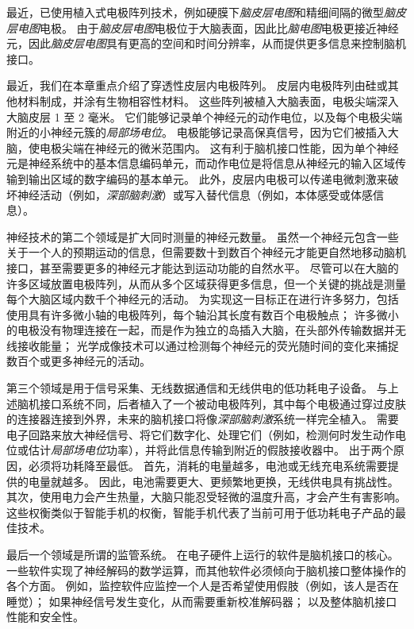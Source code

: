 最近，已使用植入式电极阵列技术，例如硬膜下\textit{脑皮层电图}和精细间隔的微型\textit{脑皮层电图}电极。
由于\textit{脑皮层电图}电极位于大脑表面，因此比\textit{脑电图}电极更接近神经元，因此\textit{脑皮层电图}具有更高的空间和时间分辨率，从而提供更多信息来控制脑机接口。


最近，我们在本章重点介绍了穿透性皮层内电极阵列。
皮层内电极阵列由硅或其他材料制成，并涂有生物相容性材料。
这些阵列被植入大脑表面，电极尖端深入大脑皮层 1 至 2 毫米。
它们能够记录单个神经元的动作电位，以及每个电极尖端附近的小神经元簇的\textit{局部场电位}。
电极能够记录高保真信号，因为它们被插入大脑，使电极尖端在神经元的微米范围内。
这有利于脑机接口性能，因为单个神经元是神经系统中的基本信息编码单元，而动作电位是将信息从神经元的输入区域传输到输出区域的数字编码的基本单元。
此外，皮层内电极可以传递电微刺激来破坏神经活动（例如，\textit{深部脑刺激}）或写入替代信息（例如，本体感受或体感信息）。


神经技术的第二个领域是扩大同时测量的神经元数量。 
虽然一个神经元包含一些关于一个人的预期运动的信息，但需要数十到数百个神经元才能更自然地移动脑机接口，甚至需要更多的神经元才能达到运动功能的自然水平。
尽管可以在大脑的许多区域放置电极阵列，从而从多个区域获得更多信息，但一个关键的挑战是测量每个大脑区域内数千个神经元的活动。
为实现这一目标正在进行许多努力，包括使用具有许多微小轴的电极阵列，每个轴沿其长度有数百个电极触点； 许多微小的电极没有物理连接在一起，而是作为独立的岛插入大脑，在头部外传输数据并无线接收能量；
光学成像技术可以通过检测每个神经元的荧光随时间的变化来捕捉数百个或更多神经元的活动。


第三个领域是用于信号采集、无线数据通信和无线供电的低功耗电子设备。
与上述脑机接口系统不同，后者植入了一个被动电极阵列，其中每个电极通过穿过皮肤的连接器连接到外界，未来的脑机接口将像\textit{深部脑刺激}系统一样完全植入。
需要电子回路来放大神经信号、将它们数字化、处理它们（例如，检测何时发生动作电位或估计\textit{局部场电位}功率），并将此信息传输到附近的假肢接收器中。
出于两个原因，必须将功耗降至最低。
首先，消耗的电量越多，电池或无线充电系统需要提供的电量就越多。
因此，电池需要更大、更频繁地更换，无线供电具有挑战性。
其次，使用电力会产生热量，大脑只能忍受轻微的温度升高，才会产生有害影响。
这些权衡类似于智能手机的权衡，智能手机代表了当前可用于低功耗电子产品的最佳技术。


最后一个领域是所谓的监管系统。
在电子硬件上运行的软件是脑机接口的核心。 
一些软件实现了神经解码的数学运算，而其他软件必须倾向于脑机接口整体操作的各个方面。
例如，监控软件应监控一个人是否希望使用假肢（例如，该人是否在睡觉）；
如果神经信号发生变化，从而需要重新校准解码器；
以及整体脑机接口性能和安全性。


